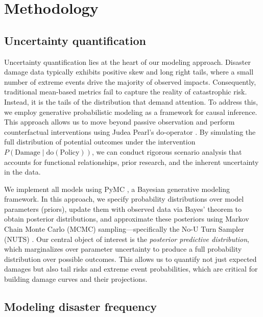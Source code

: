 
\section{Methodology}
\label{sec:methodology}

\subsection{Uncertainty quantification}

Uncertainty quantification lies at the heart of our modeling approach. Disaster damage data typically exhibits positive skew and long right tails, where a small number of extreme events drive the majority of observed impacts. Consequently, traditional mean-based metrics fail to capture the reality of catastrophic risk. Instead, it is the tails of the distribution that demand attention. To address this, we employ generative probabilistic modeling \citep{gelman1995bayesian} as a framework for causal inference. This approach allows us to move beyond passive observation and perform counterfactual interventions using Judea Pearl's do-operator \citep{pearl2009causality}. By simulating the full distribution of potential outcomes under the intervention $P(\text{Damage} \mid \text{do}(\text{Policy}))$, we can conduct rigorous scenario analysis that accounts for functional relationships, prior research, and the inherent uncertainty in the data.

We implement all models using PyMC \citep{abril2023pymc}, a Bayesian generative modeling framework. In this approach, we specify probability distributions over model parameters (priors), update them with observed data via Bayes' theorem to obtain posterior distributions, and approximate these posteriors using Markov Chain Monte Carlo (MCMC) sampling---specifically the No-U Turn Sampler (NUTS) \citep{hoffman2014no}. Our central object of interest is the \textit{posterior predictive distribution}, which marginalizes over parameter uncertainty to produce a full probability distribution over possible outcomes. This allows us to quantify not just expected damages but also tail risks and extreme event probabilities, which are critical for building damage curves and their projections.

\subsection{Modeling disaster frequency}

